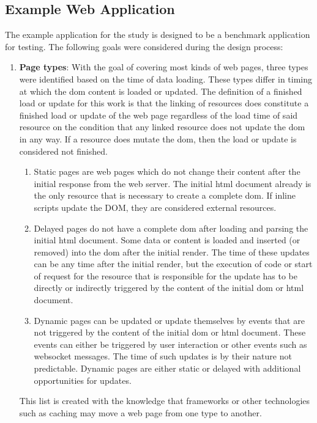 \documentclass[a4paper, 12pt]{article}
\begin{document}
\subsection{Example Web Application}\label{subsec:exampleapplication}
%
% 

The example application for the study is designed to be a benchmark application for testing.
The following goals were considered during the design process:

\begin{enumerate}
  \item \textbf{Page types}: With the goal of covering most kinds of web pages, three types were identified based on the time of data loading.\label{enum:pagetypes}
  These types differ in timing at which the \acrshort{dom} content is loaded or updated.
  The definition of a finished load or update for this work is that the linking of resources does constitute a finished load or update of the web page regardless of the load time of said resource on the condition that any linked resource does not update the \acrshort{dom} in any way.
  If a resource does mutate the \acrshort{dom}, then the load or update is considered not finished.
  \begin{enumerate}
    \item Static pages are web pages which do not change their content after the initial response from the web server.
    The initial \acrshort{html} document already is the only resource that is necessary to create a complete \acrshort{dom}.
    If inline scripts update the DOM, they are considered external resources.
    \item Delayed pages do not have a complete \acrshort{dom} after loading and parsing the initial \acrshort{html} document.
    Some data or content is loaded and inserted (or removed) into the \acrshort{dom} after the initial render.
    The time of these updates can be any time after the initial render, but the execution of code or start of request for the resource that is responsible for the update has to be directly or indirectly triggered by the content of the initial \acrshort{dom} or \acrshort{html} document.
    \item Dynamic pages can be updated or update themselves by events that are not triggered by the content of the initial \acrshort{dom} or \acrshort{html} document.
    These events can either be triggered by user interaction or other events such as websocket messages.
    The time of such updates is by their nature not predictable.
    Dynamic pages are either static or delayed with additional opportunities for updates.
  \end{enumerate}
  This list is created with the knowledge that frameworks or other technologies such as caching may move a web page from one type to another.


\end{enumerate}
\end{document}
